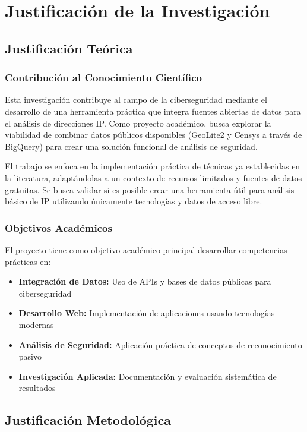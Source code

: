 \section{Justificación de la Investigación}

\subsection{Justificación Teórica}

\subsubsection{Contribución al Conocimiento Científico}
Esta investigación contribuye al campo de la ciberseguridad mediante el desarrollo de una herramienta práctica que integra fuentes abiertas de datos para el análisis de direcciones IP. Como proyecto académico, busca explorar la viabilidad de combinar datos públicos disponibles (GeoLite2 y Censys a través de BigQuery) para crear una solución funcional de análisis de seguridad.

El trabajo se enfoca en la implementación práctica de técnicas ya establecidas en la literatura, adaptándolas a un contexto de recursos limitados y fuentes de datos gratuitas. Se busca validar si es posible crear una herramienta útil para análisis básico de IP utilizando únicamente tecnologías y datos de acceso libre.

\subsubsection{Objetivos Académicos}
El proyecto tiene como objetivo académico principal desarrollar competencias prácticas en:

\begin{itemize}
    \item \textbf{Integración de Datos:} Uso de APIs y bases de datos públicas para ciberseguridad
    \item \textbf{Desarrollo Web:} Implementación de aplicaciones usando tecnologías modernas
    \item \textbf{Análisis de Seguridad:} Aplicación práctica de conceptos de reconocimiento pasivo
    \item \textbf{Investigación Aplicada:} Documentación y evaluación sistemática de resultados
\end{itemize}

\subsection{Justificación Metodológica}

